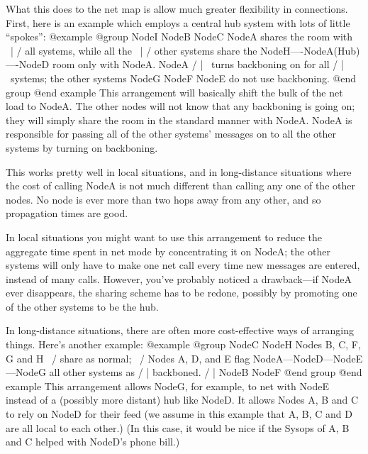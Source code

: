 What this does to the net map is allow much greater
flexibility in connections.  First, here is an example which employs a
central hub system with lots of little ``spokes'':
@example
@group
      NodeI  NodeB  NodeC          NodeA shares the room with
          \    |    /              all systems, while all the
           \   |   /               other systems share the
  NodeH----NodeA(Hub)----NodeD     room only with NodeA.  NodeA
           /   |   \               turns backboning on for all
          /    |    \              systems; the other systems
      NodeG  NodeF  NodeE          do not use backboning.
@end group
@end example
This arrangement will basically shift the bulk of the net load
to NodeA.  The other nodes will not know that any backboning is
going on; they will simply share the room in the standard manner
with NodeA.  NodeA is responsible for passing all of the other
systems' messages on to all the other systems by turning on
backboning.

This works pretty well in local situations, and in long-distance
situations where the cost of calling NodeA is not much
different than calling any one of the other nodes.  No node is ever
more than two hops away from any other, and so propagation times
are good.

In local situations you might want to use this arrangement
to reduce the aggregate time spent in net mode by concentrating it
on NodeA; the other systems will only have to make one net call
every time new messages are entered, instead of many calls.
However, you've probably noticed a drawback---if NodeA ever
disappears, the sharing scheme has to be redone, possibly by
promoting one of the other systems to be the hub.

In long-distance situations, there are often more cost-effective
ways of arranging things.  Here's another example:
@example
@group
  NodeC                NodeH          Nodes B, C, F, G and H
    \                   /             share as normal;
     \                 /              Nodes A, D, and E flag
    NodeA---NodeD---NodeE---NodeG     all other systems as
     /        |                       backboned.
    /         |                       
  NodeB     NodeF                    
@end group
@end example
This arrangement allows NodeG, for example, to net with
NodeE instead of a (possibly more distant) hub like NodeD.  It
allows Nodes A, B and C to rely on NodeD for their feed (we assume
in this example that A, B, C and D are all local to each other.)
(In this case, it would be nice if the Sysops of A, B and C helped
with NodeD's phone bill.)

